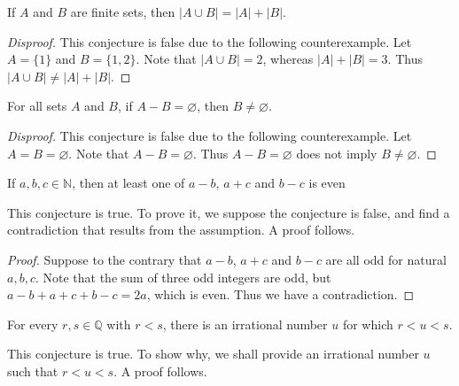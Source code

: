 \documentclass{exam}
\begin{document}
\begin{conjecture}{9.16}
    If $A$ and $B$ are finite sets, then $\lvert A\cup B\rvert=\lvert A\rvert +\lvert B\rvert$.
\end{conjecture}

\begin{proof}[Disproof]
    This conjecture is false due to the following counterexample. Let $A=\{1\}$ and $B=\{1,2\}$. Note that $\lvert A\cup B\rvert=2$, whereas $\lvert A\rvert+\lvert B\rvert=3$. Thus $\lvert A\cup B\rvert\neq\lvert A\rvert +\lvert B\rvert$.
\end{proof}

\begin{conjecture}{9.17}
    For all sets $A$ and $B$, if $A-B=\varnothing$, then $B\neq\varnothing$.
\end{conjecture}

\begin{proof}[Disproof]
    This conjecture is false due to the following counterexample. Let $A = B = \varnothing$. Note that $A - B = \varnothing$. Thus $A-B =\varnothing$ does not imply $B \neq\varnothing$.
\end{proof}

\begin{conjecture}{9.18}
    If $a,b,c\in\mathbb N$, then at least one of $a-b$, $a+c$ and $b-c$ is even
\end{conjecture}

This conjecture is true. To prove it, we suppose the conjecture is false, and find a contradiction that results from the assumption. A proof follows.

\begin{proof}
    Suppose to the contrary that $a-b$, $a+c$ and $b-c$ are all odd for natural $a, b ,c$. Note that the sum of three odd integers are odd, but $a-b + a + c + b-c = 2a$, which is even. Thus we have a contradiction.
\end{proof}

\begin{conjecture}{9.19}
    For every $r, s\in\mathbb Q$ with $r<s$, there is an irrational number $u$ for which $r<u<s$.
\end{conjecture}

This conjecture is true. To show why, we shall provide an irrational number $u$ such that $r < u < s$. A proof follows.
\end{document}
